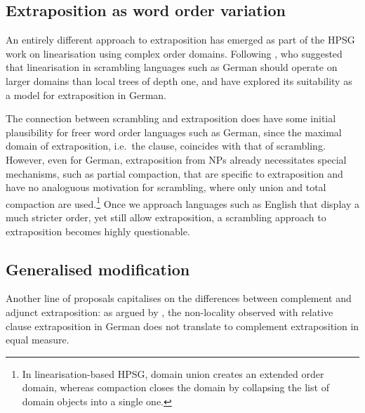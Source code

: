 \documentclass[output=paper
	        ,collection
	        ,collectionchapter
 	        ,biblatex
                ,babelshorthands
                ,newtxmath
                ,draftmode
                ,colorlinks, citecolor=brown
]{langscibook}
\begin{document}
{\subsection{Extraposition as word order variation}

An entirely different approach to extraposition has emerged as part of
the HPSG work on linearisation using complex order domains. Following
\citet{Reape:94}, who suggested that linearisation in scrambling
languages such as German should operate on larger domains than local
trees of depth one, \citet{Kathol:95b,kathol_a00} and \citet{KP95a}
have explored its suitability as a model for extraposition in German.


The connection between scrambling and extraposition does have some
initial plausibility for freer word order languages such as German,
since the maximal domain of extraposition, i.e.\ the clause, coincides
with that of scrambling. However, even for German, extraposition from
NPs already necessitates special mechanisms, such as partial
compaction, that are specific to extraposition and have no analoguous
motivation for scrambling, where only union and total compaction are
used.\footnote{In linearisation-based HPSG, domain union creates an
  extended order domain, whereas compaction closes the domain by
  collapsing the list of domain objects into a single one.} Once we
approach languages such as English that display a much stricter order,
yet still allow extraposition, a scrambling approach to extraposition
becomes highly questionable.


\subsection{Generalised modification}

Another line of proposals capitalises on the differences between
complement and adjunct extraposition: as argued by
\citet[284]{kiss_t02nllt}, the non-locality observed with relative clause
extraposition in German does not translate to complement extraposition
in equal measure.

\begin{exe}
  \ex \label{ex:ExtraNP}
  \begin{xlist}


\end{xlist}
\end{exe}}
\end{document}
